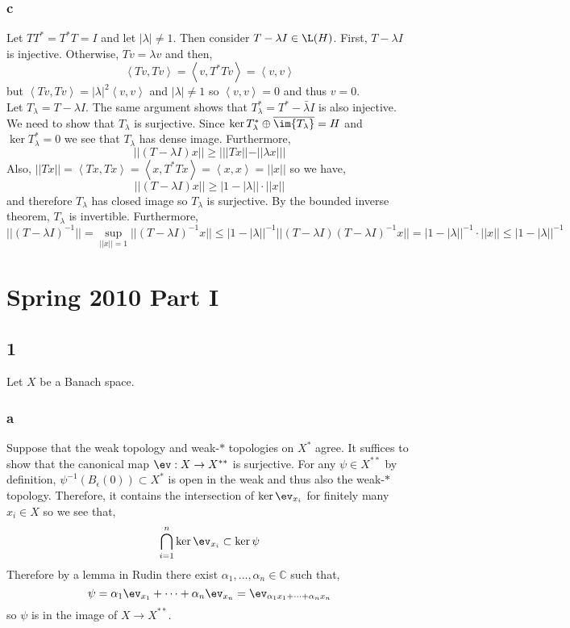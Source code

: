 \documentclass[12pt]{article}
\newcommand{\inner}[2]{\left< #1, #2 \right>}
\renewcommand{\C}{\mathbb{C}}
\begin{document}
\subsubsection{c}

Let $T T^* = T^* T = I$ and let $| \lambda | \neq 1$. Then consider $T - \lambda I \in \L(H)$. First, $T - \lambda I$ is injective. Otherwise, $T v = \lambda v$ and then,
\[ \inner{T v}{T v} = \inner{v}{T^* T v} = \inner{v}{v} \]
but $\inner{T v}{T v} = |\lambda|^2 \inner{v}{v}$ and $|\lambda| \neq 1$ so $\inner{v}{v} = 0$ and thus $v = 0$. 
\bigskip\\
Let $T_\lambda = T - \lambda I$. The same argument shows that $T_\lambda^* = T^* - \bar{\lambda} I$ is also injective. We need to show that $T_\lambda$ is surjective. Since $\ker{T^*_\lambda} \oplus \overline{\im{T_\lambda}} = H$ and $\ker{T^*_\lambda} = 0$ we see that $T_\lambda$ has dense image. Furthermore, 
\[ || (T - \lambda I) x ||  \ge | || T x || - || \lambda x || | \]
Also, $|| T x || = \inner{T x}{T x} = \inner{x}{T^* T x} = \inner{x}{x} = || x ||$ so we have,
\[ || (T - \lambda I) x || \ge | 1 - |\lambda| | \cdot || x || \]
and therefore $T_\lambda$ has closed image so $T_\lambda$ is surjective. By the bounded inverse theorem, $T_\lambda$ is invertible. Furthermore, 
\[ || (T - \lambda I)^{-1} || = \sup_{|| x || = 1} || (T - \lambda I)^{-1} x || \le | 1 - | \lambda | |^{-1} || (T - \lambda I) (T - \lambda I)^{-1} x || = | 1 - | \lambda | |^{-1} \cdot || x || \le | 1 - | \lambda | |^{-1} \]

\section{Spring 2010 Part I}

\subsection{1}

Let $X$ be a Banach space.

\subsubsection{a}

Suppose that the weak topology and weak-$*$ topologies on $X^*$ agree. It suffices to show that the canonical map $\ev : X \to X^{**}$ is surjective. For any $\psi \in X^{**}$ by definition, $\psi^{-1}(B_\epsilon(0)) \subset X^*$ is open in the weak and thus also the weak-$*$ topology. Therefore, it contains the intersection of $\ker{\ev_{x_i}}$ for finitely many $x_i \in X$ so we see that,
\[ \bigcap_{i = 1}^n \ker{\ev_{x_i}} \subset \ker{\psi} \]
Therefore by a lemma in Rudin there exist $\alpha_1, \dots, \alpha_n \in \C$ such that,
\[ \psi = \alpha_1 \ev_{x_1} + \cdots + \alpha_n \ev_{x_n} = \ev_{\alpha_1 x_1 + \cdots + \alpha_n x_n} \]
so $\psi$ is in the image of $X \to X^{**}$. 
\end{document}
